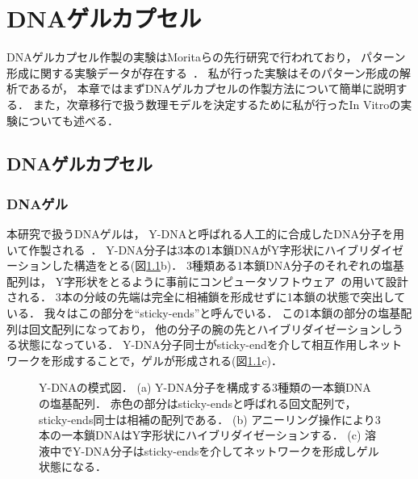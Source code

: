 \chapter{DNAゲルカプセル}
\label{sec:dnagel}

DNAゲルカプセル作製の実験はMoritaらの先行研究で行われており，
パターン形成に関する実験データが存在する~\cite{moritasan}．
私が行った実験はそのパターン形成の解析であるが，
本章ではまずDNAゲルカプセルの作製方法について簡単に説明する．
また，次章移行で扱う数理モデルを決定するために私が行ったIn Vitroの実験についても述べる．

\section{DNAゲルカプセル}

\subsection{DNAゲル}
本研究で扱うDNAゲルは，
Y-DNAと呼ばれる人工的に合成したDNA分子を用いて作製される~\cite{morita2017formation}．
Y-DNA分子は3本の1本鎖DNAがY字形状にハイブリダイゼーションした構造をとる(図\ref{fig:ydna}b)．
3種類ある1本鎖DNA分子のそれぞれの塩基配列は，
Y字形状をとるように事前にコンピュータソフトウェア~\cite{zadeh2011nupack}の用いて設計される．
3本の分岐の先端は完全に相補鎖を形成せずに1本鎖の状態で突出している．
我々はこの部分を``sticky-ends''と呼んでいる．
この1本鎖の部分の塩基配列は回文配列になっており，
他の分子の腕の先とハイブリダイゼーションしうる状態になっている．
Y-DNA分子同士がsticky-endを介して相互作用しネットワークを形成することで，ゲルが形成される(図\ref{fig:ydna}c)．
\begin{figure}
    \centering
    
    \caption{Y-DNAの模式図．
        (a) Y-DNA分子を構成する3種類の一本鎖DNAの塩基配列．
            赤色の部分はsticky-endsと呼ばれる回文配列で，sticky-ends同士は相補の配列である．
        (b) アニーリング操作により3本の一本鎖DNAはY字形状にハイブリダイゼーションする．
        (c) 溶液中でY-DNA分子はsticky-endsを介してネットワークを形成しゲル状態になる．
    }
    \label{fig:ydna}
\end{figure}

